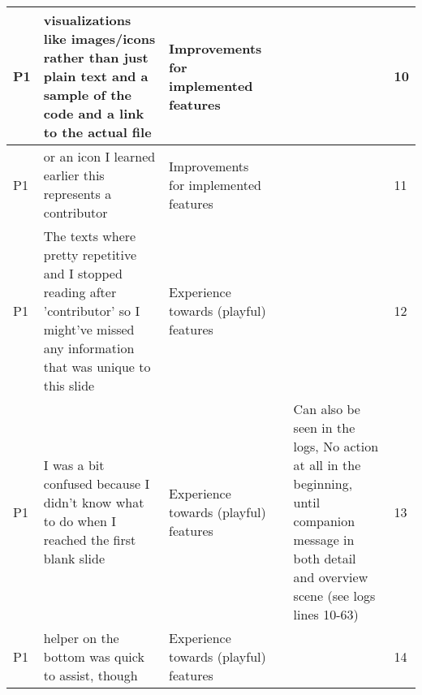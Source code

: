 \begin{appendices}
\begin{landscape}
\begin{longtable}{|p{0.8cm}|p{7cm}|p{3cm}|p{3cm}|p{5.5cm}|p{0.5cm}|}
      P1                   & visualizations like images/icons rather than just plain text and a sample of the code and a link to the actual file                                                                                                                                                         & Improvements for implemented features    &                                    &                                                                                                                                                    & 10           \\ \hline
      P1                   & or an icon I learned earlier this represents a contributor                                                                                                                                                                                                                  & Improvements for implemented features    &                                    &                                                                                                                                                    & 11           \\ \hline
      P1                   & The texts where pretty repetitive and I stopped reading after 'contributor' so I might've missed any information that was unique to this slide                                                                                                                              & Experience towards (playful) features    &                                    &                                                                                                                                                    & 12           \\ \hline
      P1                   & I was a bit confused because I didn't know what to do when I reached the first blank slide                                                                                                                                                                                  & Experience towards (playful) features    &                                    & Can also be seen in the logs, No action at all in the beginning,  until companion message in both detail and overview scene (see logs lines 10-63) & 13           \\ \hline
      P1                   & helper on the bottom was quick to assist, though                                                                                                                                                                                                                            & Experience towards (playful) features    &                                    &                                                                                                                                                    & 14           \\ \hline

\end{longtable}
\end{landscape}
\end{appendices}
